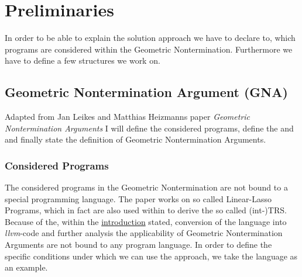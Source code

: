 \chapter{Preliminaries}
\label{ch:preliminaries}

In order to be able to explain the solution approach we have to declare to, which programs are considered within the Geometric Nontermination. Furthermore we have to define a few structures we work on.

\section{Geometric Nontermination Argument (GNA)}
Adapted from Jan Leikes and Matthias Heizmanns paper \textit{Geometric Nontermination Arguments} \cite{leike2014geometric} I will define the considered programs, define the \stem and \loopt and finally state the definition of Geometric Nontermination Arguments.

\subsection{Considered Programs}
The considered programs in the Geometric Nontermination are not bound to a special programming language. The paper works on so called Linear-Lasso Programs, which in fact %
are also used within \aprove to derive the so called (int-)TRS. Because of the, within the \hyperref[sec:aprove]{introduction} stated, conversion of the language into \textit{llvm}-code and further analysis the applicability of Geometric Nontermination Arguments are not bound to any program language. \newline %
In order to define the specific conditions under which we can use the approach, we take the language  as an example.

